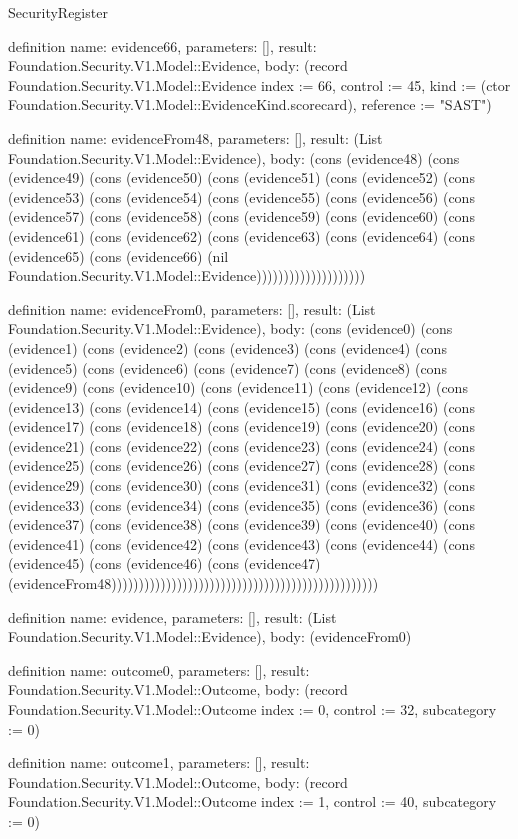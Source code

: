 \begin{lexlean}{SecurityRegister}
\begin{semanticmodule}
definition{
  name: evidence66,
  parameters: [],
  result: Foundation.Security.V1.Model::Evidence,
  body: (record Foundation.Security.V1.Model::Evidence {index := 66, control := 45, kind := (ctor Foundation.Security.V1.Model::EvidenceKind.scorecard), reference := "SAST"})
}

definition{
  name: evidenceFrom48,
  parameters: [],
  result: (List Foundation.Security.V1.Model::Evidence),
  body: (cons (evidence48) (cons (evidence49) (cons (evidence50) (cons (evidence51) (cons (evidence52) (cons (evidence53) (cons (evidence54) (cons (evidence55) (cons (evidence56) (cons (evidence57) (cons (evidence58) (cons (evidence59) (cons (evidence60) (cons (evidence61) (cons (evidence62) (cons (evidence63) (cons (evidence64) (cons (evidence65) (cons (evidence66) (nil Foundation.Security.V1.Model::Evidence))))))))))))))))))))
}

definition{
  name: evidenceFrom0,
  parameters: [],
  result: (List Foundation.Security.V1.Model::Evidence),
  body: (cons (evidence0) (cons (evidence1) (cons (evidence2) (cons (evidence3) (cons (evidence4) (cons (evidence5) (cons (evidence6) (cons (evidence7) (cons (evidence8) (cons (evidence9) (cons (evidence10) (cons (evidence11) (cons (evidence12) (cons (evidence13) (cons (evidence14) (cons (evidence15) (cons (evidence16) (cons (evidence17) (cons (evidence18) (cons (evidence19) (cons (evidence20) (cons (evidence21) (cons (evidence22) (cons (evidence23) (cons (evidence24) (cons (evidence25) (cons (evidence26) (cons (evidence27) (cons (evidence28) (cons (evidence29) (cons (evidence30) (cons (evidence31) (cons (evidence32) (cons (evidence33) (cons (evidence34) (cons (evidence35) (cons (evidence36) (cons (evidence37) (cons (evidence38) (cons (evidence39) (cons (evidence40) (cons (evidence41) (cons (evidence42) (cons (evidence43) (cons (evidence44) (cons (evidence45) (cons (evidence46) (cons (evidence47) (evidenceFrom48)))))))))))))))))))))))))))))))))))))))))))))))))
}

definition{
  name: evidence,
  parameters: [],
  result: (List Foundation.Security.V1.Model::Evidence),
  body: (evidenceFrom0)
}

definition{
  name: outcome0,
  parameters: [],
  result: Foundation.Security.V1.Model::Outcome,
  body: (record Foundation.Security.V1.Model::Outcome {index := 0, control := 32, subcategory := 0})
}

definition{
  name: outcome1,
  parameters: [],
  result: Foundation.Security.V1.Model::Outcome,
  body: (record Foundation.Security.V1.Model::Outcome {index := 1, control := 40, subcategory := 0})
}


\end{semanticmodule}
\end{lexlean}
